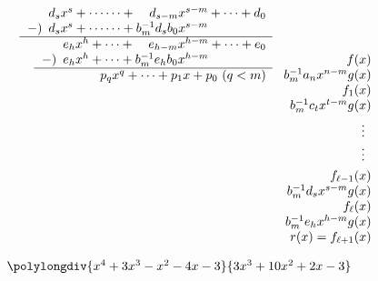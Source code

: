 \begin{table}
\begin{lrbox}{\EuclidChangchu}
\begin{math}
\begin{array}{@{}l@{\hspace*{-6pt}}c@{\hspace*{-7pt}}l@{\hspace*{-11pt}}r@{\hspace*{-14pt}}l@{}}
\begin{array}[t]{l}
\begin{array}{r}
\begin{array}{r@{\hspace{5pt}}r@{{}+\dotsb\dotsb+{}}r@{}l}
               & d_sx^s &     d_{s-m}x^{s-m} & {}+\dotsb+d_0 \\
\left.-\right) & d_sx^s & b_m^{-1}d_sb_0x^{s-m} \\ \hline  \end{array}\\
\begin{array}{r@{\hspace{5pt}}r@{{}+\dotsb+{}}r@{}l}
               & e_hx^h &     e_{h-m}x^{h-m} & {}+\dotsb+e_0 \\
\left.-\right) & e_hx^h & b_m^{-1}e_hb_0x^{h-m} \\ \hline \end{array} \\
\begin{array}{c} p_qx^q+\dotsb+p_1x+p_0~(q<m) \end{array}
\end{array}\end{array}
& \begin{array}[t]{r@{}}
\\ f(x) \\ b_m^{-1}a_nx^{n-m}g(x) \\ f_1(x) \\ b_m^{-1}c_tx^{t-m}g(x) \\[3pt] \vdots\enspace \\ \vdots\enspace \\[3pt]
f_{\ell-1}(x) \\ b_m^{-1}d_sx^{s-m}g(x) \\ f_{\ell}(x) \\ b_m^{-1}e_hx^{h-m}g(x) \\ r(x)=f_{\ell+1}(x) \end{array}
\end{array}\end{math}
\end{lrbox}
\begin{lrbox}{\EuclidLiTi}
\begin{math}
\polylongdiv{x^4+3x^3-x^2-4x-3}{3x^3+10x^2+2x-3}
\end{math}
\end{lrbox}
\CenterFloatBoxes
\begin{floatrow}[5]
\def\tableboxsep{\enskip}
\tablebox[\ccwd]{}{\rule{.6pt}{.8\wd\EuclidChangchu}}
\end{floatrow}
\end{table}

